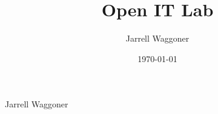 \documentclass{beamer}
\title[Developers]{Open IT Lab}
\author{Jarrell Waggoner}
\institute[Open IT Lab] {Open IT Lab\\
  \medskip
      {\emph{waggonej@email.sc.edu}} }
\date{\today}
\begin{document}
\rm

{
  \begin{frame}
    \vspace{18em}

    \begin{center}\large{\textcolor{beamer@mygrey}{Jarrell Waggoner}}\end{center}


  \end{frame}
}

\end{document}
